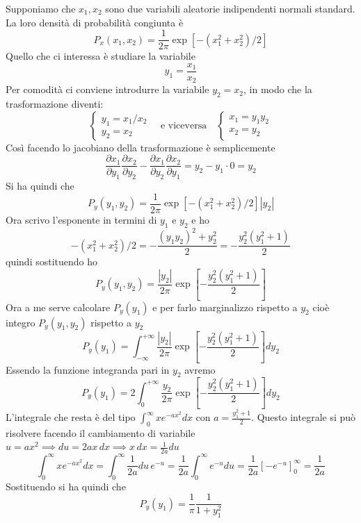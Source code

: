 \documentclass[openany,a4paper,12pt]{book}
\theoremstyle{remark}
\begin{document}
Supponiamo che $x_1, x_2$ sono due variabili aleatorie indipendenti normali standard. La loro densità di probabilità congiunta è
\[
P_{x}(x_1, x_2) = \frac{1}{2\pi} \exp\left[ -(x_1^2 + x_2^2)/2 \right]
\]
Quello che ci interessa è studiare la variabile
\[
y_1 = \frac{x_1}{x_2}
\]
Per comodità ci conviene introdurre la variabile $y_2 = x_2$, in modo che la trasformazione diventi:
\[
\begin{cases}
y_1 = x_1 / x_2 \\
y_2 = x_2
\end{cases}
\quad \text{e viceversa} \quad
\begin{cases}
x_1 = y_1 y_2 \\
x_2 = y_2
\end{cases}
\]
Così facendo lo jacobiano della trasformazione è semplicemente
\[
\frac{\partial x_1}{\partial y_1} \frac{\partial x_2}{\partial y_2} - \frac{\partial x_1}{\partial y_2} \frac{\partial x_2}{\partial y_1} = y_2 - y_1 \cdot 0 = y_2
\]
Si ha quindi che
\[
P_y(y_1, y_2) = \frac{1}{2\pi} \exp\left[ -(x_1^2 + x_2^2)/2 \right] |y_2|
\]
Ora scrivo l'esponente in termini di $y_1$ e $y_2$ e ho
\[
- (x_1^2 + x_2^2)/2 = - \frac{(y_1 y_2)^2 + y_2^2}{2} = - \frac{y_2^2 (y_1^2 + 1)}{2}
\]
quindi sostituendo ho
\[
P_y(y_1, y_2) = \frac{|y_2|}{2\pi} \exp\left[ - \frac{y_2^2 (y_1^2 + 1)}{2} \right]
\]
Ora a me serve calcolare $P_y(y_1)$ e per farlo marginalizzo rispetto a $y_2$ cioè integro $P_y(y_1, y_2)$ rispetto a $y_2$
\[
P_y(y_1) = \int_{-\infty}^{+\infty} \frac{|y_2|}{2\pi} \exp\left[ - \frac{y_2^2 (y_1^2 + 1)}{2} \right] dy_2
\]
Essendo la funzione integranda pari in $y_2$ avremo
\[
P_y(y_1) = 2 \int_{0}^{+\infty} \frac{y_2}{2\pi} \exp\left[ - \frac{y_2^2 (y_1^2 + 1)}{2} \right] dy_2
\]
L'integrale che resta è del tipo $\int_{0}^{\infty} x e^{-ax^2} dx$ con $a = \frac{y_1^2 + 1}{2}$. Questo integrale si può risolvere facendo il cambiamento di variabile $u = ax^2 \implies du = 2ax \, dx \implies x \, dx = \frac{1}{2a} du$
\[
\int_{0}^{\infty} x e^{-ax^2} dx = \int_{0}^{\infty} \frac{1}{2a} du \, e^{-u} = \frac{1}{2a} \int_{0}^{\infty} e^{-u} du = \frac{1}{2a} \left[ -e^{-u} \right]_0^\infty = \frac{1}{2a}
\]
Sostituendo si ha quindi che
\[
P_y(y_1) = \frac{1}{\pi} \frac{1}{1 + y_1^2}
\]
\end{document}
